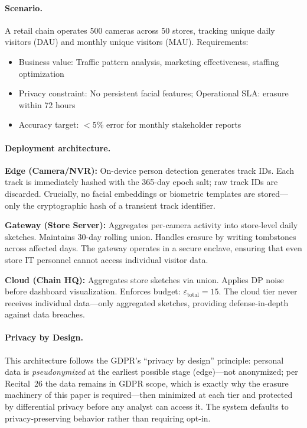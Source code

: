\documentclass[sigconf,anonymous,review]{acmart}
\begin{document}
\paragraph{Scenario.}

A retail chain operates 500 cameras across 50 stores, tracking unique daily visitors (DAU) and monthly unique visitors (MAU). Requirements:
\begin{itemize}
    \item Business value: Traffic pattern analysis, marketing effectiveness, staffing optimization
    \item Privacy constraint: No persistent facial features; Operational SLA: erasure within 72 hours
    \item Accuracy target: $<$5\% error for monthly stakeholder reports
\end{itemize}

\paragraph{Deployment architecture.}

\textbf{Edge (Camera/NVR):} On-device person detection generates track IDs. Each track is immediately hashed with the 365-day epoch salt; raw track IDs are discarded. Crucially, no facial embeddings or biometric templates are stored---only the cryptographic hash of a transient track identifier.

\textbf{Gateway (Store Server):} Aggregates per-camera activity into store-level daily sketches. Maintains 30-day rolling union. Handles erasure by writing tombstones across affected days. The gateway operates in a secure enclave, ensuring that even store IT personnel cannot access individual visitor data.

\textbf{Cloud (Chain HQ):} Aggregates store sketches via union. Applies DP noise before dashboard visualization. Enforces budget: $\varepsilon_{\text{total}} = 15$. The cloud tier never receives individual data---only aggregated sketches, providing defense-in-depth against data breaches.

\paragraph{Privacy by Design.} This architecture follows the GDPR's ``privacy by design'' principle: personal data is \emph{pseudonymized} at the earliest possible stage (edge)---not anonymized; per Recital~26 the data remains in GDPR scope, which is exactly why the erasure machinery of this paper is required---then minimized at each tier and protected by differential privacy before any analyst can access it. The system defaults to privacy-preserving behavior rather than requiring opt-in.
\end{document}
